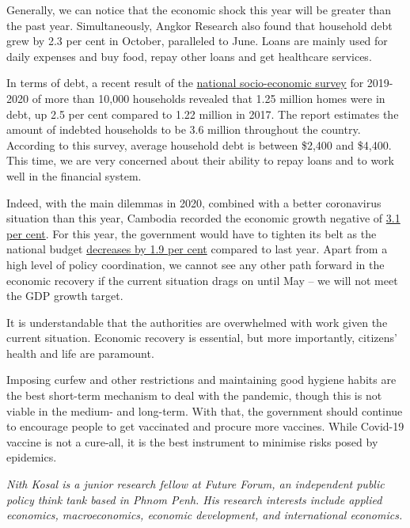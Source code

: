 \documentclass[10pt,a4paper]{letter}
\begin{document}
Generally, we can notice that the economic shock this year will be greater than the past year. Simultaneously, Angkor Research also found that household debt grew by 2.3 per cent in October, paralleled to June. Loans are mainly used for daily expenses and buy food, repay other loans and get healthcare services.

In terms of debt, a recent result of the \href{https://www.nis.gov.kh/nis/CSES/Final%20Report%20of%20Cambodia%20Socio-Economic%20Survey%202019-20_EN.pdf}{national socio-economic survey} for 2019-2020 of more than 10,000 households revealed that 1.25 million homes were in debt, up 2.5 per cent compared to 1.22 million in 2017. The report estimates the amount of indebted households to be 3.6 million throughout the country. According to this survey, average household debt is between \$2,400 and \$4,400. This time, we are very concerned about their ability to repay loans and to work well in the financial system.

Indeed, with the main dilemmas in 2020, combined with a better coronavirus situation than this year, Cambodia recorded the economic growth negative of \href{https://www.voacambodia.com/a/fast-spreading-cluster-puts-economic-rebound-on-the-back-burner/5813220.html}{3.1 per cent}. For this year, the government would have to tighten its belt as the national budget \href{https://www.phnompenhpost.com/national/govt-approves-2021-budget}{decreases by 1.9 per cent} compared to last year. Apart from a high level of policy coordination, we cannot see any other path forward in the economic recovery if the current situation drags on until May -- we will not meet the GDP growth target.

It is understandable that the authorities are overwhelmed with work given the current situation. Economic recovery is essential, but more importantly, citizens' health and life are paramount.

Imposing curfew and other restrictions and maintaining good hygiene habits are the best short-term mechanism to deal with the pandemic, though this is not viable in the medium- and long-term. With that, the government should continue to encourage people to get vaccinated and procure more vaccines. While Covid-19 vaccine is not a cure-all, it is the best instrument to minimise risks posed by epidemics.


\textit{Nith Kosal is a junior research fellow at Future Forum, an independent public policy think tank based in Phnom Penh. His research interests include applied economics, macroeconomics, economic development, and international economics.}
\end{document}
